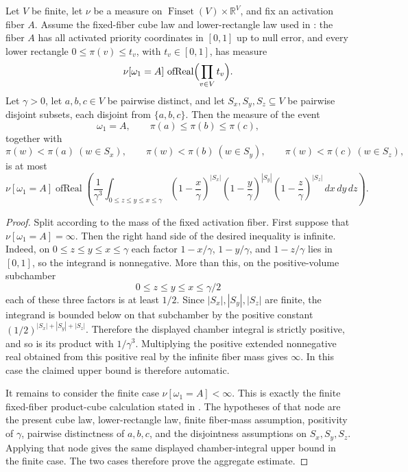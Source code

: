 \begin{helper}
Let \(V\) be finite, let \(\nu\) be a measure on
\(\operatorname{Finset}(V)\times \mathbb R^V\), and fix an activation fiber
\(A\).  Assume the fixed-fiber cube law and lower-rectangle law used in
: the fiber \(A\) has all activated
priority coordinates in \([0,1]\) up to null error, and every lower rectangle
\(0\le \pi(v)\le t_v\), with \(t_v\in[0,1]\), has measure
\[
\nu[\omega_1=A]\,\operatorname{ofReal}\Bigl(\prod_{v\in V} t_v\Bigr).
\]
Let \(\gamma>0\), let \(a,b,c\in V\) be pairwise distinct, and let
\(S_x,S_y,S_z\subseteq V\) be pairwise disjoint subsets, each disjoint from
\(\{a,b,c\}\).  Then the measure of the event
\[
\omega_1=A,\qquad
\pi(a)\le \pi(b)\le \pi(c),
\]
together with
\[
\pi(w)<\pi(a)\ (w\in S_x),\qquad
\pi(w)<\pi(b)\ (w\in S_y),\qquad
\pi(w)<\pi(c)\ (w\in S_z),
\]
is at most
\[
\nu[\omega_1=A]\operatorname{ofReal}\left(
\frac{1}{\gamma^3}
\int_{0\le z\le y\le x\le\gamma}
\left(1-\frac{x}{\gamma}\right)^{|S_x|}
\left(1-\frac{y}{\gamma}\right)^{|S_y|}
\left(1-\frac{z}{\gamma}\right)^{|S_z|}\,dx\,dy\,dz\right).
\]
\end{helper}
\begin{proof}
Split according to the mass of the fixed activation fiber.  First suppose that
\(\nu[\omega_1=A]=\infty\).  Then the right hand side of the desired
inequality is infinite.  Indeed, on \(0\le z\le y\le x\le\gamma\) each factor
\(1-x/\gamma\), \(1-y/\gamma\), and \(1-z/\gamma\) lies in \([0,1]\), so the
integrand is nonnegative.  More than this, on the positive-volume subchamber
\[
0\le z\le y\le x\le \gamma/2
\]
each of these three factors is at least \(1/2\).  Since
\(|S_x|,|S_y|,|S_z|\) are finite, the integrand is bounded below on that
subchamber by the positive constant
\((1/2)^{|S_x|+|S_y|+|S_z|}\).  Therefore the displayed chamber integral is
strictly positive, and so is its product with \(1/\gamma^3\).  Multiplying the
positive extended nonnegative real obtained from this positive real by the
infinite fiber mass gives \(\infty\).  In this case the claimed upper bound is
therefore automatic.

It remains to consider the finite case
\(\nu[\omega_1=A]<\infty\).  This is exactly the finite fixed-fiber
product-cube calculation stated in
.  The hypotheses of
that node are the present cube law, lower-rectangle law, finite fiber-mass
assumption, positivity of \(\gamma\), pairwise distinctness of \(a,b,c\), and
the disjointness assumptions on \(S_x,S_y,S_z\).  Applying that node gives the
same displayed chamber-integral upper bound in the finite case.  The two cases
therefore prove the aggregate estimate.
\end{proof}

